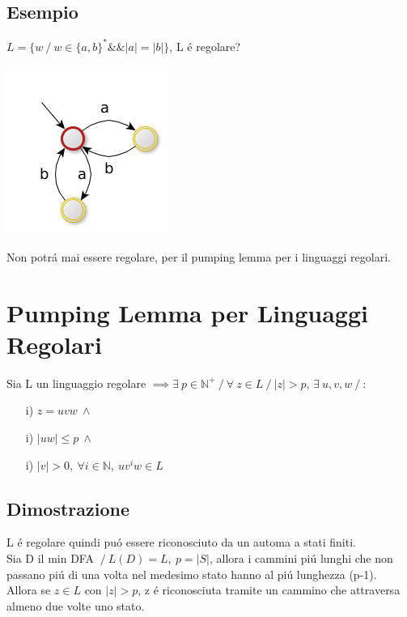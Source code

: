 \subsection{Esempio}
$L=\{ w \ / \ w \in \{ a, b \} ^* \&\& |a|=|b|\}$, L \'e regolare?
\begin{center}
	\includegraphics[scale=0.6]{Chapters/Img/c02_13.png}\\
\end{center} 
Non potr\'a mai essere regolare, per il pumping lemma per i linguaggi regolari.

\section{Pumping Lemma per Linguaggi Regolari}

Sia L un linguaggio regolare
$\implies \exists\ p \in \mathbb{N}^+ \ / \ \forall\ z \in L \ / \ |z| > p$,
$\exists\ u,v,w \ / \ $:

\begin{itemize}
    \item[i)] $z = uvw\ \land$\\
    \item[i)] $|uw| \leq p\ \land$\\
    \item[i)] $|v| > 0,\ \forall i \in \mathbb{N},\ u v^i w \in L$\\
\end{itemize}

\subsection{Dimostrazione}
L \'e regolare quindi pu\'o essere riconosciuto da un automa a stati finiti.\\
Sia D il min DFA $\ / \ L(D) = L,\ p = |S|$, allora i cammini pi\'u lunghi che non passano pi\'u di una volta nel medesimo 
stato hanno al pi\'u lunghezza (p-1).\\
Allora se $z \in L$ con $|z|>p$, z \'e riconosciuta tramite un cammino che attraversa almeno due volte uno stato. \\

